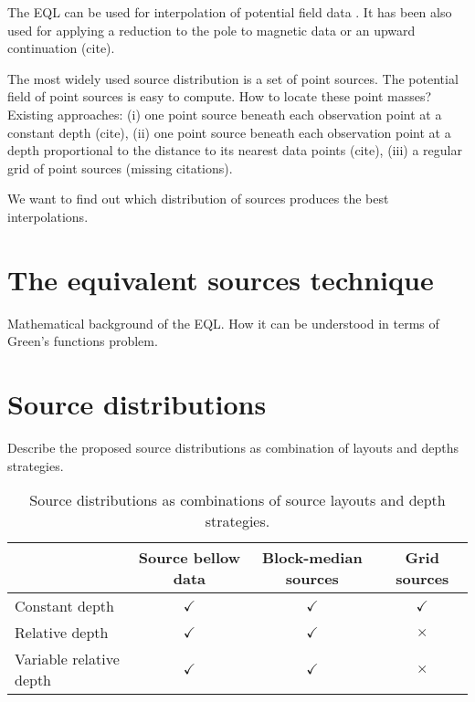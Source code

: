 \documentclass[twocolumn]{article}
\begin{document}
The EQL can be used for interpolation of potential field data \citep{cordell1992,
cooper2000}.
It has been also used for applying a reduction to the pole to magnetic data
\citep{guspi2009, silva1986, emilia1973, nakatsuka2006} or an upward continuation
(cite).

The most widely used source distribution is a set of point sources.
The potential field of point sources is easy to compute.
How to locate these point masses?
Existing approaches:
(i) one point source beneath each observation point at a constant depth (cite),
(ii) one point source beneath each observation point at a depth proportional to the
distance to its nearest data points (cite),
(iii) a regular grid of point sources (missing citations).

We want to find out which distribution of sources produces the best interpolations.



\section{The equivalent sources technique}

Mathematical background of the EQL\@.
How it can be understood in terms of Green's functions problem.



\section{Source distributions}

Describe the proposed source distributions as combination of layouts and depths
strategies.

\begin{table*}
    \begin{minipage}{80mm}
        \caption{
            Source distributions as combinations of source layouts and depth
            strategies.
        }
        \label{tab:source-distributions}
        \begin{tabular}{lccc}
            & Source bellow data & Block-median sources & Grid sources \\ \hline
            Constant depth          & $\checkmark$ & $\checkmark$ & $\checkmark$ \\
            Relative depth          & $\checkmark$ & $\checkmark$ & $\times$     \\
            Variable relative depth & $\checkmark$ & $\checkmark$ & $\times$     \\
        \end{tabular}
    \end{minipage}
\end{table*}
\end{document}
